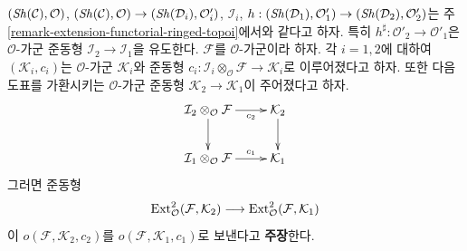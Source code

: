 \begin{remark}
\label{remark-obstruction-extension-functorial-ringed-topoi}
$(\mathop{\mathit{Sh}}\nolimits(\mathcal{C}), \mathcal{O})$,
$(\mathop{\mathit{Sh}}\nolimits(\mathcal{C}), \mathcal{O}) \to (\mathop{\mathit{Sh}}\nolimits(\mathcal{D}_i), \mathcal{O}'_i)$,
$\mathcal{I}_i$, $h : (\mathop{\mathit{Sh}}\nolimits(\mathcal{D}_1), \mathcal{O}'_1) \to
(\mathop{\mathit{Sh}}\nolimits(\mathcal{D}_2), \mathcal{O}'_2)$는 주
\ref{remark-extension-functorial-ringed-topoi}에서와 같다고 하자. 특히
$h^\sharp : \mathcal{O}'_2 \to \mathcal{O}'_1$은 $\mathcal{O}$-가군
준동형 $\mathcal{I}_2 \to \mathcal{I}_1$을 유도한다.
$\mathcal{F}$를 $\mathcal{O}$-가군이라 하자. 각 $i = 1, 2$에 대하여
$(\mathcal{K}_i, c_i)$는 $\mathcal{O}$-가군 $\mathcal{K}_i$와 준동형
$c_i : \mathcal{I}_i \otimes_\mathcal{O} \mathcal{F} \to
\mathcal{K}_i$로 이루어졌다고 하자. 또한 다음 도표를 가환시키는
$\mathcal{O}$-가군 준동형 $\mathcal{K}_2 \to \mathcal{K}_1$이
주어졌다고 하자.
$$
\xymatrix{
\mathcal{I}_2 \otimes_\mathcal{O} \mathcal{F}
\ar[r]_-{c_2} \ar[d] &
\mathcal{K}_2 \ar[d] \\
\mathcal{I}_1 \otimes_\mathcal{O} \mathcal{F}
\ar[r]^-{c_1} &
\mathcal{K}_1
}
$$
그러면 준동형
$$
\mathop{\mathrm{Ext}}\nolimits^2_\mathcal{O}(\mathcal{F}, \mathcal{K}_2)
\longrightarrow
\mathop{\mathrm{Ext}}\nolimits^2_\mathcal{O}(\mathcal{F}, \mathcal{K}_1)
$$
이 $o(\mathcal{F}, \mathcal{K}_2, c_2)$를
$o(\mathcal{F}, \mathcal{K}_1, c_1)$로 보낸다고 {\bf 주장}한다.


\end{remark}
